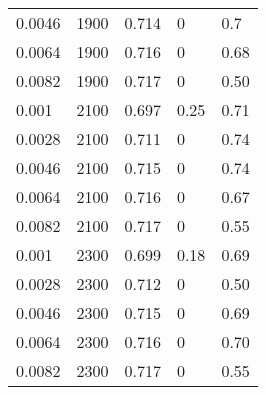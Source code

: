 \begin{table}[tbp]
\begin{center}
\begin{tabular}{lllll}
\num{0,0046} & \num{1900} & \num{0,714} & \num{0}    & \num{0,7}\\
\num{0,0064} & \num{1900} & \num{0,716} & \num{0}    & \num{0,68}\\
\num{0,0082} & \num{1900} & \num{0,717} & \num{0}    & \num{0,50}\\
\num{0,001}  & \num{2100} & \num{0,697} & \num{0,25} & \num{0,71}\\
\num{0,0028} & \num{2100} & \num{0,711} & \num{0}    & \num{0,74}\\
\num{0,0046} & \num{2100} & \num{0,715} & \num{0}    & \num{0,74}\\
\num{0,0064} & \num{2100} & \num{0,716} & \num{0}    & \num{0,67}\\
\num{0,0082} & \num{2100} & \num{0,717} & \num{0}    & \num{0,55}\\
\num{0,001}  & \num{2300} & \num{0,699} & \num{0,18} & \num{0,69}\\
\num{0,0028} & \num{2300} & \num{0,712} & \num{0}    & \num{0,50}\\
\num{0,0046} & \num{2300} & \num{0,715} & \num{0}    & \num{0,69}\\
\num{0,0064} & \num{2300} & \num{0,716} & \num{0}    & \num{0,70}\\
\num{0,0082} & \num{2300} & \num{0,717} & \num{0}    & \num{0,55}\\
  \hline
  \end{tabular}
  \end{center}
\end{table}

